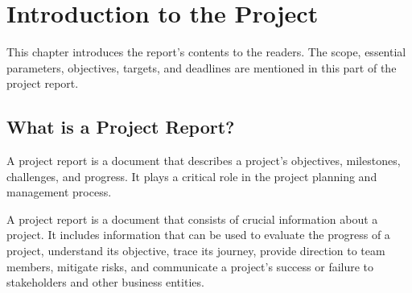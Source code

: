 \chapter{Introduction to the Project}

This chapter introduces the report’s contents to the readers. The scope, essential parameters, objectives, targets, and deadlines are mentioned in this part of the project report.



\section{What is a Project Report?}
A project report is a document that describes a project’s objectives, milestones, challenges, and progress. It plays a critical role in the project planning and management process.

A project report is a document that consists of crucial information about a project. It includes information that can be used to evaluate the progress of a project, understand its objective, trace its journey, provide direction to team members, mitigate risks, and communicate a project’s success or failure to stakeholders and other business entities. \cite{Bradshaw}